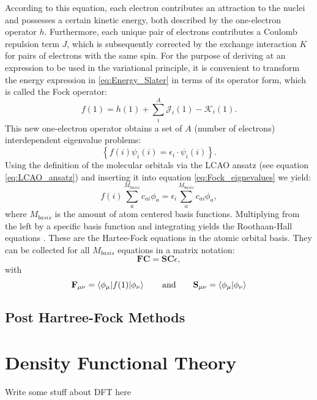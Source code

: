 According to this equation, each electron contributes an attraction to the nuclei and possesses a certain kinetic energy, both described by the one-electron operator $h$. Furthermore, each unique pair of electrons contributes a Coulomb repulsion term $J$, which is subsequently corrected by the exchange interaction $K$ for pairs of electrons with the same spin. For the purpose of deriving at an expression to be used in the variational principle, it is convenient to transform the energy expression in \ref{eq:Energy_Slater} in terms of its operator form, which is called the Fock operator:
\begin{equation}
    f(1) = h(1) + \sum_{i}^{A}\mathcal{J}_{i}(1)-\mathcal{K}_{i}(1).
    \label{eq:fock_operator}
\end{equation}
This new one-electron operator obtains a set of $A$ (number of electrons) interdependent eigenvalue problems: 
\begin{equation}
    \left\{
    f(i)\psi_{i}(i) = \epsilon_{i} \cdot \psi_{i}(i) \right\}.
    \label{eq:Fock_eignevalues}
\end{equation}
Using the definition of the molecular orbitals via the LCAO ansatz (see equation \ref{eq:LCAO_ansatz}) and inserting it into equation \ref{eq:Fock_eignevalues} we yield:
\begin{equation}
    f(i)\sum_{a}^{M_{basis}}c_{ai}\phi_{a} = \epsilon_{i}\sum_{a}^{M_{basis}}c_{ai}\phi_{a},
    \label{eq:Fock_eignevalues_plugged_in}
\end{equation}
where $M_{basis}$ is the amount of atom centered basis functions. Multiplying from the left by a specific basis function and integrating yields the Roothaan-Hall equations \cite{RevModPhys.23.69}. These are the Hartee-Fock equations in the atomic orbital basis. They can be collected for all $M_{basis}$ equations in a matrix notation:
\begin{equation}
    \textbf{FC} = \textbf{SC}\epsilon, 
    \label{eq:Hartree_fock_equation_matrix}
\end{equation}
with 
\begin{equation}
    \textbf{F}_{\mu\nu} = \braket{\phi_{\mu}|f(1)|\phi_{\nu}} \qquad \mathrm{and} \qquad \textbf{S}_{\mu\nu} = \braket{\phi_{\mu}|\phi_{\nu}}
    \label{eq:Fock_matrix}
\end{equation}
\subsection{Post Hartree-Fock Methods}
\label{sec:Post_Hartree-Fock_Methods}

\section{Density Functional Theory}
\label{sec:DFT}
Write some stuff about DFT here